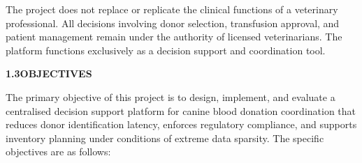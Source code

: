 \documentclass[12pt,a4paper]{article}
\begin{document}
\noindent The project does not replace or replicate the clinical functions of a veterinary professional. All decisions involving donor selection, transfusion approval, and patient management remain under the authority of licensed veterinarians. The platform functions exclusively as a decision support and coordination tool.

\vspace{2em}
\noindent\textbf{1.3\quad OBJECTIVES}
\vspace{0.8em}

\noindent The primary objective of this project is to design, implement, and evaluate a centralised decision support platform for canine blood donation coordination that reduces donor identification latency, enforces regulatory compliance, and supports inventory planning under conditions of extreme data sparsity. The specific objectives are as follows:
\end{document}
